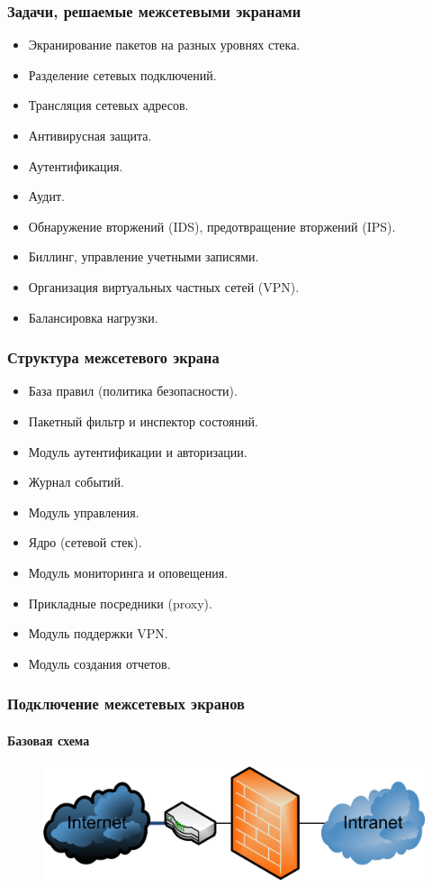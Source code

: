 \begin{frame}
    \frametitle{Задачи, решаемые межсетевыми экранами}
    
    \begin{itemize}
        \item Экранирование пакетов на разных уровнях стека.
        \item Разделение сетевых подключений.
        \item Трансляция сетевых адресов.
        \item Антивирусная защита.
        \item Аутентификация.
        \item Аудит.
        \item Обнаружение вторжений (IDS), предотвращение вторжений (IPS).
        \item Биллинг, управление учетными записями.
        \item Организация виртуальных частных сетей (VPN).
        \item Балансировка нагрузки.
    \end{itemize}
\end{frame}


\begin{frame}
    \frametitle{Структура межсетевого экрана}
    
    \begin{itemize}
        \item База правил (политика безопасности).
        \item Пакетный фильтр и инспектор состояний.
        \item Модуль аутентификации и авторизации.
        \item Журнал событий.
        \item Модуль управления.
        \item Ядро (сетевой стек).
        \item Модуль мониторинга и оповещения.
        \item Прикладные посредники (proxy).
        \item Модуль поддержки VPN.
        \item Модуль создания отчетов.
    \end{itemize}
\end{frame}


\begin{frame}
    \frametitle{Подключение межсетевых экранов}
    \framesubtitle{Базовая схема}
    
    \begin{figure}
        \includegraphics[width=.9\textwidth]{fig/fwallbase}\\
    \end{figure}
\end{frame}

